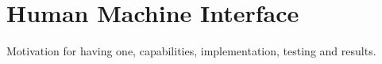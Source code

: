 \section{Human Machine Interface \label{sec:rc_hmi_sec}}

Motivation for having one, capabilities, implementation, testing and results.
